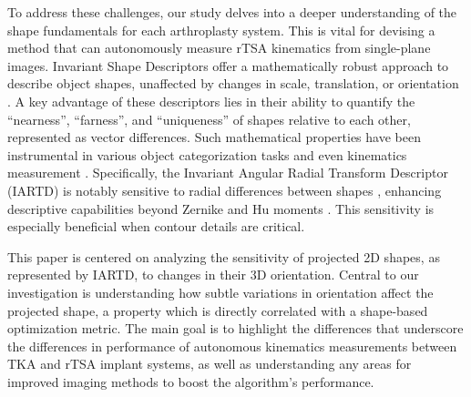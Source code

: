 To address these challenges, our study delves into a deeper understanding of the shape fundamentals for each arthroplasty system.
This is vital for devising a method that can autonomously measure rTSA kinematics from single-plane images.
Invariant Shape Descriptors offer a mathematically robust approach to describe object shapes, unaffected by changes in scale, translation, or orientation \cite{zhangReviewShapeRepresentation2004}.
A key advantage of these descriptors lies in their ability to quantify the ``nearness'', ``farness'', and ``uniqueness'' of shapes relative to each other, represented as vector differences.
Such mathematical properties have been instrumental in various object categorization tasks \cite{richardIdentificationThreeDimensionalObjects1974,wallaceAnalysisThreedimensionalMovement1980,wallaceEfficientThreedimensionalAircraft1980} and even kinematics measurement \cite{banksAccurateMeasurementThreedimensional1996}.
Specifically, the Invariant Angular Radial Transform Descriptor (IARTD) is notably sensitive to radial differences between shapes \cite{leeNewShapeDescription2012}, enhancing descriptive capabilities beyond Zernike and Hu moments \cite{khotanzadInvariantImageRecognition1990,kimRegionbasedShapeDescriptor2000,leeNewShapeDescription2012}.
This sensitivity is especially beneficial when contour details are critical.

This paper is centered on analyzing the sensitivity of projected 2D shapes, as represented by IARTD, to changes in their 3D orientation.
Central to our investigation is understanding how subtle variations in orientation affect the projected shape, a property which is directly correlated with a shape-based optimization metric.
The main goal is to highlight the differences that underscore the differences in performance of autonomous kinematics measurements between TKA and rTSA implant systems, as well as understanding any areas for improved imaging methods to boost the algorithm's performance.


